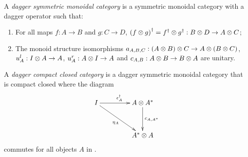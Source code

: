 \begin{definition}\label{def:daggersmc}
  A \emph{dagger symmetric monoidal category} is a symmetric monoidal category \cD{} with a dagger
  operator such that:
  \begin{enumerate}[{(}i{)}]
    \item For all maps $f:A\to B$ and $g:C\to D$, ${(f\otimes g)}^{\dagger} = {f}^{\dagger}\otimes{g}^{\dagger}:B\otimes D \to A\otimes C$;\label{defitem:dagger_smc_one}
    \item The monoid structure isomorphisms $a_{A,B,C}:(A\otimes B)\otimes C\to A\otimes(B\otimes C)$, $u^l_{A}:I\otimes A\to
      A$, $u^r_{A}:A\otimes I \to A$ and  $c_{A,B}:A\otimes B \to B\otimes A$ are unitary.\label{defitem:dagger_smc_two}
  \end{enumerate}
\end{definition}


\begin{definition}\label{def:daggercompact}
  A \emph{dagger compact closed category} \cD{} is a dagger symmetric monoidal category
  that is compact closed where the diagram
  \[
    \xymatrix @C+20pt @R+10pt{
      I \ar[r]^{\epsilon^{\dagger}_{A}} \ar[dr]_{\eta_{A}} &A\*A^{*}\ar[d]^{c_{A,A^{*}}}\\
      &A^{*}\* A
    }
  \]
  commutes for all  objects $A$ in \cD.
\end{definition}

